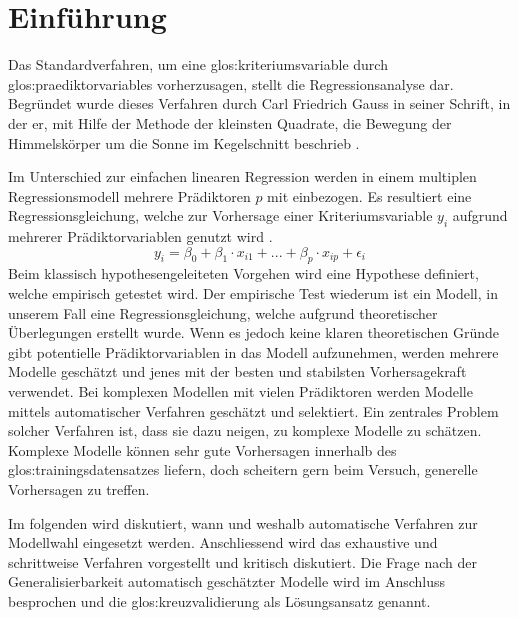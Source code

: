 \section{Einführung}
Das Standardverfahren, um eine \Gls{glos:kriteriumsvariable} durch \Glspl{glos:praediktorvariable} vorherzusagen, stellt die Regressionsanalyse dar.
Begründet wurde dieses Verfahren durch Carl Friedrich Gauss in seiner Schrift, in der er, mit Hilfe der Methode der kleinsten Quadrate, die Bewegung der Himmelskörper um die Sonne im Kegelschnitt beschrieb \cite{gauss1809theoria}. 

Im Unterschied zur einfachen linearen Regression werden in einem multiplen Regressionsmodell mehrere Prädiktoren $p$ mit einbezogen. 
Es resultiert eine Regressionsgleichung, welche zur Vorhersage einer Kriteriumsvariable $y_i$ aufgrund mehrerer Prädiktorvariablen genutzt wird  \cite[S. 448]{bortz2011}. 
\begin{equation}
y_i = \beta_0 + \beta_1\cdot x_{i1} + ... +  \beta_p\cdot x_{ip} + \epsilon_i
\tag{multiple lineare Regression}
\end{equation}
Beim klassisch hypothesengeleiteten Vorgehen wird eine Hypothese definiert, welche empirisch getestet wird.
Der empirische Test wiederum ist ein Modell, in unserem Fall eine Regressionsgleichung, welche aufgrund theoretischer Überlegungen erstellt wurde.
Wenn es jedoch keine klaren theoretischen Gründe gibt potentielle Prädiktorvariablen in das Modell aufzunehmen, werden mehrere Modelle geschätzt und jenes mit der besten und stabilsten Vorhersagekraft verwendet.
Bei komplexen Modellen mit vielen Prädiktoren werden Modelle mittels automatischer Verfahren geschätzt und selektiert.
Ein zentrales Problem solcher Verfahren ist, dass sie dazu neigen, zu komplexe Modelle zu schätzen. 
Komplexe Modelle können sehr gute Vorhersagen innerhalb des \Gls{glos:trainingsdatensatz}es liefern, doch scheitern gern beim Versuch, generelle Vorhersagen zu treffen.

Im folgenden wird diskutiert, wann und weshalb automatische Verfahren zur Modellwahl eingesetzt werden. 
Anschliessend wird das exhaustive und schrittweise Verfahren vorgestellt und kritisch diskutiert.
Die Frage nach der Generalisierbarkeit automatisch geschätzter Modelle wird im Anschluss besprochen und die \Gls{glos:kreuzvalidierung} als Lösungsansatz genannt.